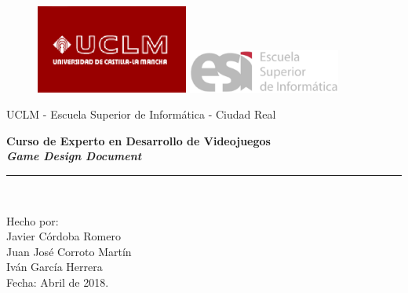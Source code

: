 \documentclass[twoside]{article}
\begin{document}
\begin{titlepage}
\begin{center}
\vspace*{-1in}
\begin{figure}[htb]
\begin{center}
\includegraphics[width=5cm]{./images/uclm_logo.eps} 
\hspace*{1.5in}
\includegraphics[width=5cm]{./images/esi_logo.eps}
\end{center}
\end{figure}
\end{center}
\begin{center}
UCLM - Escuela Superior de Informática - Ciudad Real\\
\vspace*{0.6in}
\vspace*{0.2in}
\begin{Large}
\textbf{Curso de Experto en Desarrollo de Videojuegos} \\
\textbf{\textit{Game Design Document}} \\
\end{Large}
\vspace*{0.3in}
\vspace*{0.3in}
\rule{80mm}{0.1mm}\\
\vspace*{0.1in}
\begin{large}
Hecho por: \\
Javier Córdoba Romero \\
Juan José Corroto Martín \\
Iván García Herrera \\
\vspace*{0.3in}
Fecha: Abril de 2018.\\
\end{large}
\end{center}

\end{titlepage}
\tableofcontents
\newpage
\end{document}
